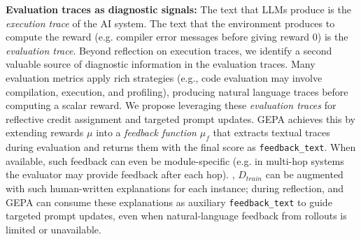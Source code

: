 \textbf{Evaluation traces as diagnostic signals:}\label{par:explaining_feedback_metric}  The text that LLMs produce is the \textit{execution trace} of the AI system. The text that the environment produces to compute the reward (e.g. compiler error messages before giving reward 0) is the \textit{evaluation trace}.
Beyond reflection on execution traces, we identify a second valuable source of diagnostic information in the evaluation traces. Many evaluation metrics apply rich strategies (e.g., code evaluation may involve compilation, execution, and profiling), producing natural language traces before computing a scalar reward. We propose leveraging these \textit{evaluation traces} for reflective credit assignment and targeted prompt updates. GEPA achieves this by extending rewards $\mu$ into a \textit{feedback function} $\mu_f$ that extracts textual traces during evaluation and returns them with the final score as \lstinline{feedback_text}. When available, such feedback can even be module-specific (e.g. in multi-hop systems the evaluator may provide feedback after each hop). , $D_{train}$ can be augmented with such human-written explanations for each instance; during reflection, and GEPA can consume these explanations as auxiliary \lstinline{feedback_text} to guide targeted prompt updates, even when natural-language feedback from rollouts is limited or unavailable.


